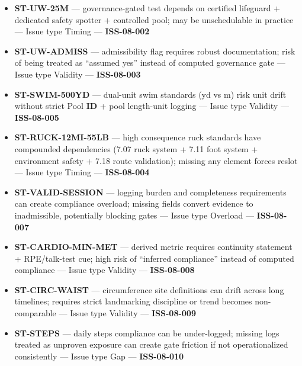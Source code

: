 \documentclass[10pt]{article}
\begin{document}
\begin{landscape}
\begin{itemize}
\item \textbf{ST-UW-25M} — governance-gated test depends on certified lifeguard + dedicated safety spotter + controlled pool; may be unschedulable in practice — Issue type Timing — \textbf{ISS-08-002}
\item \textbf{ST-UW-ADMISS} — admissibility flag requires robust documentation; risk of being treated as “assumed yes” instead of computed governance gate — Issue type Validity — \textbf{ISS-08-003}
\item \textbf{ST-SWIM-500YD} — dual-unit swim standards (yd vs m) risk unit drift without strict Pool \textbf{ID} + pool length-unit logging — Issue type Validity — \textbf{ISS-08-005}
\item \textbf{ST-RUCK-12MI-55LB} — high consequence ruck standards have compounded dependencies (7.07 ruck system + 7.11 foot system + environment safety + 7.18 route validation); missing any element forces reslot — Issue type Timing — \textbf{ISS-08-004}
\item \textbf{ST-VALID-SESSION} — logging burden and completeness requirements can create compliance overload; missing fields convert evidence to inadmissible, potentially blocking gates — Issue type Overload — \textbf{ISS-08-007}
\item \textbf{ST-CARDIO-MIN-MET} — derived metric requires continuity statement + RPE/talk-test cue; high risk of “inferred compliance” instead of computed compliance — Issue type Validity — \textbf{ISS-08-008}
\item \textbf{ST-CIRC-WAIST} — circumference site definitions can drift across long timelines; requires strict landmarking discipline or trend becomes non-comparable — Issue type Validity — \textbf{ISS-08-009}
\item \textbf{ST-STEPS} — daily steps compliance can be under-logged; missing logs treated as unproven exposure can create gate friction if not operationalized consistently — Issue type Gap — \textbf{ISS-08-010}
\end{itemize}

\end{landscape}
\end{document}
